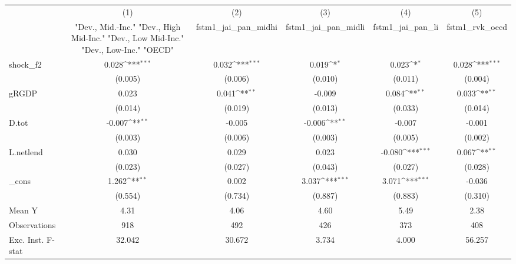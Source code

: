 {
\def\sym#1{\ifmmode^{#1}\else\(^{#1}\)\fi}
\begin{tabular}{l*{5}{c}}
\toprule
            &\multicolumn{1}{c}{(1)}&\multicolumn{1}{c}{(2)}&\multicolumn{1}{c}{(3)}&\multicolumn{1}{c}{(4)}&\multicolumn{1}{c}{(5)}\\
            &\multicolumn{1}{c}{ "Dev., Mid.-Inc." "Dev., High Mid-Inc." "Dev., Low Mid-Inc." "Dev., Low-Inc." "OECD" }&\multicolumn{1}{c}{fstm1\_jai\_pan\_midhi}&\multicolumn{1}{c}{fstm1\_jai\_pan\_midli}&\multicolumn{1}{c}{fstm1\_jai\_pan\_li}&\multicolumn{1}{c}{fstm1\_rvk\_oecd}\\
\midrule
shock\_f2    &       0.028\sym{***}&       0.032\sym{***}&       0.019\sym{*}  &       0.023\sym{*}  &       0.028\sym{***}\\
            &     (0.005)         &     (0.006)         &     (0.010)         &     (0.011)         &     (0.004)         \\
\addlinespace
gRGDP       &       0.023         &       0.041\sym{**} &      -0.009         &       0.084\sym{**} &       0.033\sym{**} \\
            &     (0.014)         &     (0.019)         &     (0.013)         &     (0.033)         &     (0.014)         \\
\addlinespace
D.tot       &      -0.007\sym{**} &      -0.005         &      -0.006\sym{**} &      -0.007         &      -0.001         \\
            &     (0.003)         &     (0.006)         &     (0.003)         &     (0.005)         &     (0.002)         \\
\addlinespace
L.netlend   &       0.030         &       0.029         &       0.023         &      -0.080\sym{***}&       0.067\sym{**} \\
            &     (0.023)         &     (0.027)         &     (0.043)         &     (0.027)         &     (0.028)         \\
\addlinespace
\_cons      &       1.262\sym{**} &       0.002         &       3.037\sym{***}&       3.071\sym{***}&      -0.036         \\
            &     (0.554)         &     (0.734)         &     (0.887)         &     (0.883)         &     (0.310)         \\
\midrule
Mean Y      &        4.31         &        4.06         &        4.60         &        5.49         &        2.38         \\
Observations&         918         &         492         &         426         &         373         &         408         \\
Exc. Inst. F-stat&      32.042         &      30.672         &       3.734         &       4.000         &      56.257         \\
\bottomrule
\end{tabular}
}
